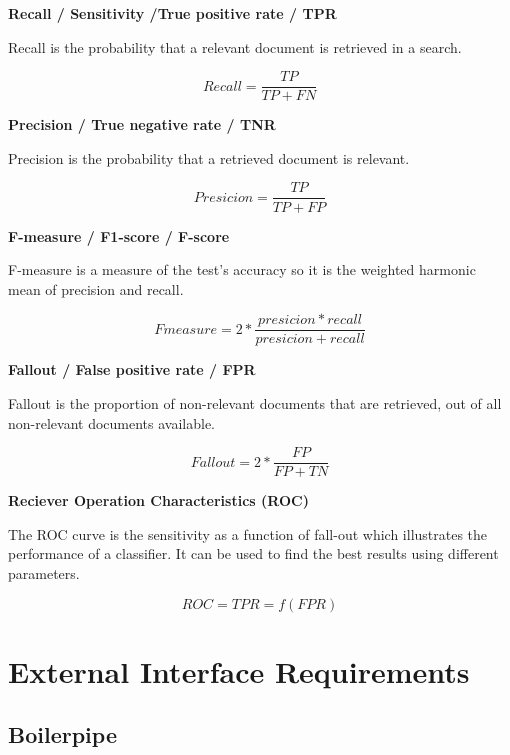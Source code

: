 \textbf{Recall / Sensitivity /True positive rate / TPR }

Recall is the probability that a relevant document is retrieved in a search.

\begin{equation}
 Recall =\frac{TP}{TP + FN}
\end{equation}

\textbf{Precision / True negative rate / TNR} 


Precision is the probability that a retrieved document is relevant.

\begin{equation}
 Presicion = \frac{TP}{TP + FP}
\end{equation}


\textbf{F-measure / F1-score / F-score} 

F-measure is a measure of the test's accuracy so it is the weighted harmonic mean of precision and recall.

\begin{equation}
Fmeasure =  2* \frac{presicion * recall}{presicion + recall}
\end{equation}

\textbf{Fallout / False positive rate / FPR}

Fallout is the proportion of non-relevant documents that are retrieved, out of all non-relevant documents available.

\begin{equation}
Fallout =  2* \frac{FP}{FP + TN}
\end{equation}

\textbf{Reciever Operation Characteristics (ROC)}

The ROC curve is the sensitivity as a function of fall-out which illustrates the performance of a classifier. It can be used to find the best results using different parameters.

\begin{equation}
 ROC = TPR = f(FPR)
\end{equation}

\section{External Interface Requirements}

\subsection{Boilerpipe}

